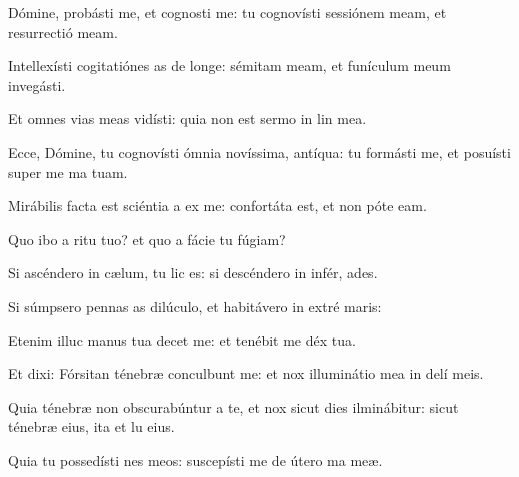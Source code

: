 \item Dómine, probásti me, et cognosti me:\psstar{} \pscross{} tu cognovísti sessiónem meam, et resurrectió meam.

\item Intellexísti cogitatiónes as de longe:\psstar{} sémitam meam, et funículum meum invegásti.

\item Et omnes vias meas vidísti:\psstar{} quia non est sermo in lin mea.

\item Ecce, Dómine, tu cognovísti ómnia novíssima,  antíqua:\psstar{} tu formásti me, et posuísti super me ma tuam.

\item Mirábilis facta est sciéntia a ex me:\psstar{} confortáta est, et non póte  eam.

\item Quo ibo a ritu tuo?\psstar{} et quo a fácie tu fúgiam?

\item Si ascéndero in cælum, tu lic es:\psstar{} si descéndero in infér, ades.

\item Si súmpsero pennas as dilúculo,\psstar{} et habitávero in extré maris:

\item Etenim illuc manus tua decet me:\psstar{} et tenébit me déx tua.

\item Et dixi: Fórsitan ténebræ conculbunt me:\psstar{} et nox illuminátio mea in delí meis.

\item Quia ténebræ non obscurabúntur a te, et nox sicut dies ilminábitur:\psstar{} sicut ténebræ eius, ita et lu eius.

\item Quia tu possedísti nes meos:\psstar{} suscepísti me de útero ma meæ.
